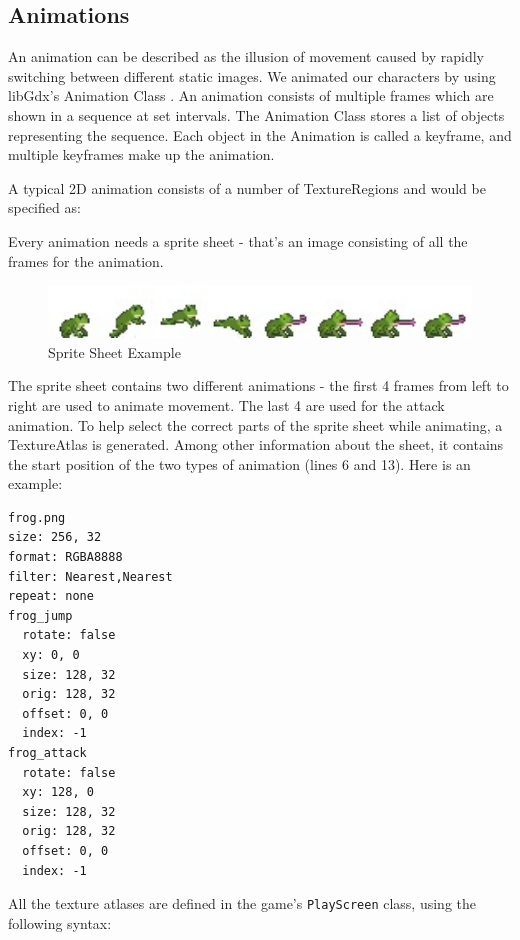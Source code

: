 \documentclass[12p]{article}
\begin{document}
\subsection{Animations} \label{DocAnimations}

An animation can be described as the illusion of movement caused by rapidly switching between different static images. We animated our characters by using libGdx's Animation Class \cite{libGdxAnimClass}. An animation consists of multiple frames which are shown in a sequence at set intervals.  The Animation Class stores a list of objects representing the sequence. Each object in the Animation is called a keyframe, and multiple keyframes make up the animation.

A typical 2D animation consists of a number of TextureRegions and would be specified as:


Every animation needs a sprite sheet - that's an image consisting of all the frames for the animation.

\begin{figure}[ht]
    \center
    \includegraphics[width=1\textwidth]{Documentation/frog.jpg}
    \caption{Sprite Sheet Example}
    \label{SpriteSheetExample}
\end{figure}

The sprite sheet contains two different animations - the first 4 frames from left to right are used to animate movement. The last 4 are used for the attack animation. To help select the correct parts of the sprite sheet while animating, a TextureAtlas is generated. Among other information about the sheet, it contains the start position of the two types of animation (lines 6 and 13). Here is an example:

\begin{verbatim}
frog.png
size: 256, 32
format: RGBA8888
filter: Nearest,Nearest
repeat: none
frog_jump
  rotate: false
  xy: 0, 0
  size: 128, 32
  orig: 128, 32
  offset: 0, 0
  index: -1
frog_attack
  rotate: false
  xy: 128, 0
  size: 128, 32
  orig: 128, 32
  offset: 0, 0
  index: -1
\end{verbatim}

All the texture atlases are defined in the game's \texttt{PlayScreen} class, using the following syntax:
\end{document}
